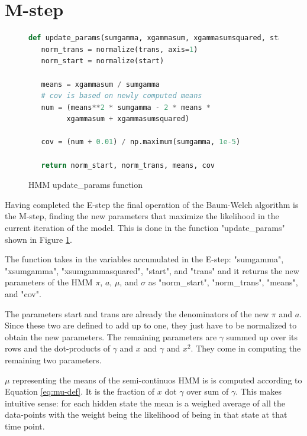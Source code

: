 \section{M-step}

\begin{figure}
\begin{singlespace}
\begin{lstlisting}[language=Python]
def update_params(sumgamma, xgammasum, xgammasumsquared, start, trans):
   norm_trans = normalize(trans, axis=1)
   norm_start = normalize(start)

   means = xgammasum / sumgamma
   # cov is based on newly computed means
   num = (means**2 * sumgamma - 2 * means *
         xgammasum + xgammasumsquared)

   cov = (num + 0.01) / np.maximum(sumgamma, 1e-5)

   return norm_start, norm_trans, means, cov
\end{lstlisting}
\end{singlespace}
\caption{HMM update\_params function}    
\label{fig:hmm-updateparams-listing}
\end{figure}

Having completed the E-step the final operation of the Baum-Welch algorithm is the M-step, finding the new parameters that maximize the likelihood in the current iteration of the model. This is done in the function "update\_params" shown in Figure \ref{fig:hmm-updateparams-listing}.

The function takes in the variables accumulated in the E-step: "sumgamma", \\ "xsumgamma", "xsumgammasquared", "start", and "trans" and it returns the new parameters of the HMM $\pi$, $a$, $\mu$, and $\sigma$ as "norm\_start", "norm\_trans", "means", and "cov". 

The parameters start and trans are already the denominators of the new $\pi$ and $a$. Since these two are defined to add up to one, they just have to be normalized to obtain the new parameters. The remaining parameters are $\gamma$ summed up over its rows and the dot-products of $\gamma$ and $x$ and $\gamma$ and $x^2$. They come in computing the remaining two parameters. 

$\mu$ representing the means of the semi-continuos HMM is is computed according to Equation \eqref{eq:mu-def}. It is the fraction of $x$ dot $\gamma$ over sum of $\gamma$. This makes intuitive sense: for each hidden state the mean is a weighed average of all the data-points with the weight being the likelihood of being in that state at that time point. 

